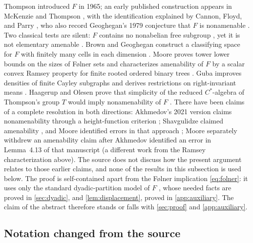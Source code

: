 \documentclass[11pt]{article}
\theoremstyle{definition}
\numberwithin{equation}{section}
\begin{document}
Thompson introduced \(F\) in 1965; an early published construction appears
in McKenzie and Thompson \cite{McKenzieThompson1973}, with the identification
explained by Cannon, Floyd, and Parry
\cite[pp.~215--216]{CannonFloydParry1996}, who also record Geoghegan's 1979
conjecture that \(F\) is nonamenable \cite[p.~227]{CannonFloydParry1996}.
Two classical tests are silent: \(F\) contains no nonabelian free subgroup
\cite[Theorem~3.1]{BrinSquier1985}, yet it is not elementary amenable
\cite[Theorem~4.10]{CannonFloydParry1996}. Brown and Geoghegan construct a
classifying space for \(F\) with finitely many cells in each dimension
\cite{BrownGeoghegan1984}. Moore proves tower lower bounds on the sizes of
F\o lner sets \cite[Theorem~1.1]{MooreFolner2013} and characterizes
amenability of \(F\) by a scalar convex Ramsey property for finite rooted
ordered binary trees \cite[Theorem~3.1]{Moore2013}. Guba improves densities
of finite Cayley subgraphs \cite{Guba2025Density} and derives restrictions on
right-invariant means \cite{Guba2026}. Haagerup and Olesen prove that
simplicity of the reduced \(C^*\)-algebra of Thompson's group \(T\) would
imply nonamenability of \(F\) \cite[Theorem~5.5]{HaagerupOlesen2017}. There
have been claims of a complete resolution in both directions: Akhmedov's 2021
version claims nonamenability through a height-function criterion
\cite{Akhmedov2021}; Shavgulidze claimed amenability \cite{Shavgulidze2009},
and Moore identified errors in that approach \cite{Moore2011Critique}; Moore
separately withdrew an amenability claim after Akhmedov identified an error
in Lemma~4.13 of that manuscript \cite{Moore2012Withdrawn} (a different work
from the Ramsey characterization above). The source does not discuss how the
present argument relates to those earlier claims, and none of the results in
this subsection is used below. The proof is self-contained apart from the
F\o lner implication \eqref{eq:folner}: it uses only the standard
dyadic-partition model of \(F\)
\cite[Section~2, Lemma~2.2]{CannonFloydParry1996}, whose needed facts are
proved in \cref{sec:dyadic}, and \cref{lem:displacement}, proved in
\cref{app:auxiliary}. The claim of the abstract therefore stands or falls
with \cref{sec:proof} and \cref{app:auxiliary}.

\subsection{Notation changed from the source}
\end{document}
